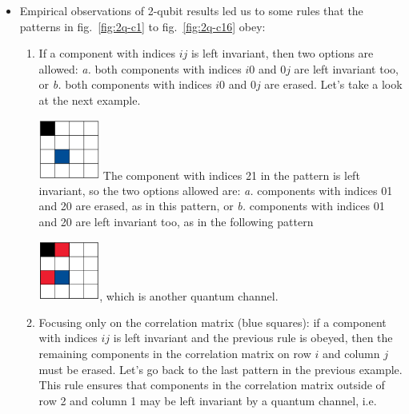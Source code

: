 \documentclass[11pt,dvipsnames]{article} %
\newcommand{\fref}[1]{fig.~\ref{#1}}  \newcommand{\tref}[1]{table~\ref{#1}}
\newcommand{\h}[1]{\colorbox{Yellow}{#1}}
\newcommand{\1}{\mathds{1}}
\begin{document}
\begin{itemize}
\item Empirical observations of 2-qubit results led us to some rules that the
patterns in \fref{fig:2q-c1} to \fref{fig:2q-c16} obey:
\begin{enumerate}
\item If a component with indices $ij$ is left invariant, then two options are
allowed: \textit{a.} both components with indices $i0$ and $0j$ are left
invariant too, or \textit{b.} both components with indices $i0$ and $0j$ are
erased.
\janote{\h{Inicio}}
Let's take a look at the next example. \newline

\hfill
\includegraphics[width=2cm]{img/ex-2q2c-empiricalRule}
\hfill \hfill
\newline
The component with indices 21 in the pattern is left invariant,
so the two options allowed are: \textit{a.} components with indices 01 and
20 are erased, as in this pattern, or \textit{b.} components 
with indices 01 and 20 are left invariant too, 
as in the following pattern \newline

\hfill
\includegraphics[width=2cm]{img/ex-2q4c-empiricalRule},
\hfill \hfill 
\newline
which is another quantum channel.

\item Focusing only on the correlation matrix (blue squares): if a component
with indices $ij$ is left invariant and the previous rule is obeyed, then the
remaining components in the correlation matrix on row $i$ and column $j$ must
be erased. 
Let's go back to the last pattern in the previous example. This rule 
ensures that components in the correlation matrix outside of row 2 and 
column 1 may be left invariant by a quantum channel, i.e.\newline


\end{enumerate}
\end{itemize}
\end{document}
